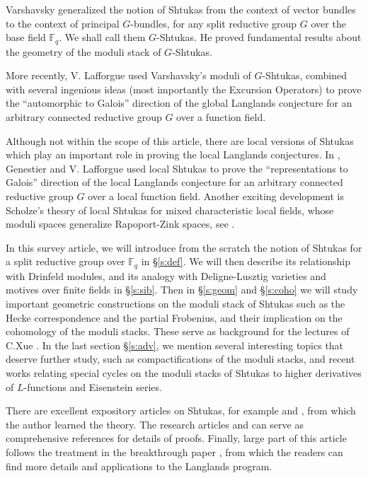 \documentclass[11pt]{amsart}
\numberwithin{equation}{section}
\theoremstyle{plain}
\theoremstyle{definition}
\def\FF{\mathbb{F}}
\begin{document}
Varshavsky \cite{Var} generalized the notion of Shtukas from the context of vector bundles to the context of principal $G$-bundles, for any split reductive group $G$ over the base field $\FF_{q}$. We shall call them $G$-Shtukas. He proved fundamental results about the geometry of the moduli stack of $G$-Shtukas.

More recently, V. Lafforgue \cite{VLaff} used Varshavsky's moduli of $G$-Shtukas, combined with several ingenious ideas (most importantly the Excursion Operators) to prove the ``automorphic to Galois'' direction of the global Langlands conjecture for an arbitrary connected reductive group $G$ over a function field. 

Although not within the scope of this article, there are local versions of Shtukas which play an important role in proving the local Langlands conjectures. In \cite{GL}, Genestier  and V. Lafforgue used local Shtukas to prove the ``representations to Galois'' direction of the local Langlands conjecture for an arbitrary connected reductive group $G$ over a local function field. Another exciting development is Scholze's theory of local Shtukas for mixed characteristic local fields, whose moduli spaces generalize Rapoport-Zink spaces, see \cite{S-Berkeley}.


In this survey article, we will introduce from the scratch the notion of Shtukas for a split reductive group over $\FF_{q}$ in \S\ref{s:def}. We will then describe its relationship with Drinfeld modules, and its analogy with Deligne-Lusztig varieties and motives over finite fields in \S\ref{s:sib}. Then in \S\ref{s:geom} and \S\ref{s:coho} we will study important geometric constructions on the moduli stack of Shtukas such as the Hecke correspondence and the partial Frobenius, and their implication on the cohomology of the moduli stacks. These serve as background for the lectures of C.Xue \cite{Xue}. In the last section  \S\ref{s:adv}, we mention several interesting topics that deserve further study, such as compactifications of the moduli stacks, and recent works relating special cycles on the moduli stacks of Shtukas to higher derivatives of $L$-functions and Eisenstein series.

There are excellent expository articles on Shtukas, for example \cite{Laumon} and \cite{NDT-Sht}, from which the author learned the theory. The research articles \cite{Var} and \cite{ARH} can serve as comprehensive references for details of proofs. Finally, large part of this article follows the treatment in the breakthrough paper \cite{VLaff}, from which the readers can find more details and applications to the Langlands program.  
\end{document}
